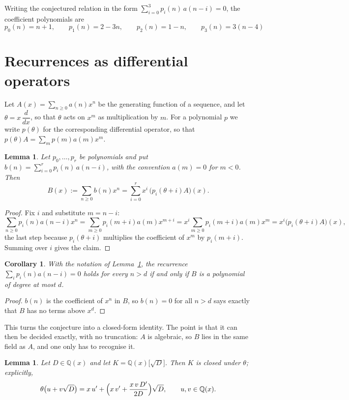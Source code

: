 \documentclass[11pt,a4paper]{article}
\theoremstyle{plain}
\newtheorem{lemma}[theorem]{Lemma}
\newtheorem{corollary}[theorem]{Corollary}
\theoremstyle{definition}
\begin{document}
Writing the conjectured relation in the form $\sum_{i=0}^{3}p_{i}(n)\,a(n-i)=0$,
the coefficient polynomials are
\[
p_{0}(n)=n + 1,\qquad p_{1}(n)=2 - 3 n,\qquad p_{2}(n)=1 - n,\qquad p_{3}(n)=3 \left(n - 4\right)
\]

\section{Recurrences as differential operators}

Let $A(x)=\sum_{n\ge0}a(n)x^{n}$ be the generating function of a sequence, and let
$\theta=x\,\dfrac{d}{dx}$, so that $\theta$ acts on $x^{m}$ as multiplication by $m$. For a
polynomial $p$ we write $p(\theta)$ for the corresponding differential operator, so that
$p(\theta)A=\sum_{m}p(m)a(m)x^{m}$.

\begin{lemma}\label{lem:transfer}
Let $p_{0},\dots,p_{r}$ be polynomials and put $b(n)=\sum_{i=0}^{r}p_{i}(n)\,a(n-i)$, with
the convention $a(m)=0$ for $m<0$. Then
\[
B(x):=\sum_{n\ge0}b(n)x^{n}=\sum_{i=0}^{r}x^{i}\,\bigl(p_{i}(\theta+i)A\bigr)(x).
\]
\end{lemma}

\begin{proof}
Fix $i$ and substitute $m=n-i$:
\[
\sum_{n\ge0}p_{i}(n)a(n-i)x^{n}=\sum_{m\ge0}p_{i}(m+i)a(m)x^{m+i}
=x^{i}\sum_{m\ge0}p_{i}(m+i)a(m)x^{m}=x^{i}\bigl(p_{i}(\theta+i)A\bigr)(x),
\]
the last step because $p_{i}(\theta+i)$ multiplies the coefficient of $x^{m}$ by
$p_{i}(m+i)$. Summing over $i$ gives the claim.
\end{proof}

\begin{corollary}\label{cor:criterion}
With the notation of Lemma~\ref{lem:transfer}, the recurrence
$\sum_{i}p_{i}(n)a(n-i)=0$ holds for every $n>d$ if and only if $B$ is a polynomial of
degree at most $d$.
\end{corollary}

\begin{proof}
$b(n)$ is the coefficient of $x^{n}$ in $B$, so $b(n)=0$ for all $n>d$ says exactly that
$B$ has no terms above $x^{d}$.
\end{proof}

This turns the conjecture into a closed-form identity. The point is that it can then be
decided exactly, with no truncation: $A$ is algebraic, so $B$ lies in the same field as
$A$, and one only has to recognise it.

\begin{lemma}\label{lem:field}
Let $D\in\mathbb{Q}(x)$ and let $K=\mathbb{Q}(x)\bigl[\sqrt{D}\bigr]$. Then $K$ is closed
under $\theta$; explicitly,
\[
\theta\bigl(u+v\sqrt{D}\bigr)=x\,u'+\Bigl(x\,v'+\frac{x\,v\,D'}{2D}\Bigr)\sqrt{D},
\qquad u,v\in\mathbb{Q}(x).
\]
\end{lemma}
\end{document}
